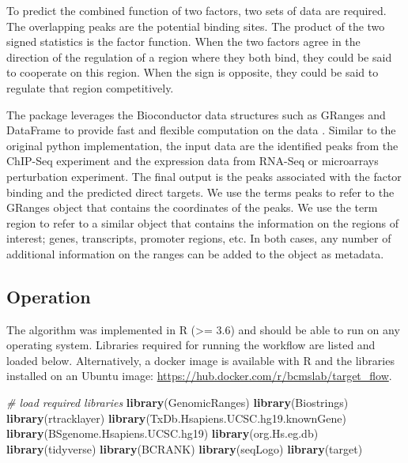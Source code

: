 \documentclass[9pt,a4paper,]{extarticle}
\newenvironment{Shaded}{\begin{snugshade}}{\end{snugshade}}
\newcommand{\CommentTok}[1]{\textcolor[rgb]{0.56,0.35,0.01}{\textit{#1}}}
\newcommand{\KeywordTok}[1]{\textcolor[rgb]{0.13,0.29,0.53}{\textbf{#1}}}
\newcommand{\NormalTok}[1]{#1}
\begin{document}
To predict the combined function of two factors, two sets of data are required. The overlapping peaks are the potential binding sites. The product of the two signed statistics is the factor function. When the two factors agree in the direction of the regulation of a region where they both bind, they could be said to cooperate on this region. When the sign is opposite, they could be said to regulate that region competitively.

The package leverages the Bioconductor data structures such as GRanges and DataFrame to provide fast and flexible computation on the data \citet{Huber2015}. Similar to the original python implementation, the input data are the identified peaks from the ChIP-Seq experiment and the expression data from RNA-Seq or microarrays perturbation experiment. The final output is the peaks associated with the factor binding and the predicted direct targets. We use the terms peaks to refer to the GRanges object that contains the coordinates of the peaks. We use the term region to refer to a similar object that contains the information on the regions of interest; genes, transcripts, promoter regions, etc. In both cases, any number of additional information on the ranges can be added to the object as metadata.

\hypertarget{operation}{%
\subsection{Operation}\label{operation}}

The algorithm was implemented in R (\textgreater= 3.6) and should be able to run on any operating system. Libraries required for running the workflow are listed and loaded below. Alternatively, a docker image is available with R and the libraries installed on an Ubuntu image: \url{https://hub.docker.com/r/bcmslab/target_flow}.

\begin{Shaded}
\begin{Highlighting}[]
\CommentTok{# load required libraries}
\KeywordTok{library}\NormalTok{(GenomicRanges)}
\KeywordTok{library}\NormalTok{(Biostrings)}
\KeywordTok{library}\NormalTok{(rtracklayer)}
\KeywordTok{library}\NormalTok{(TxDb.Hsapiens.UCSC.hg19.knownGene)}
\KeywordTok{library}\NormalTok{(BSgenome.Hsapiens.UCSC.hg19)}
\KeywordTok{library}\NormalTok{(org.Hs.eg.db)}
\KeywordTok{library}\NormalTok{(tidyverse)}
\KeywordTok{library}\NormalTok{(BCRANK)}
\KeywordTok{library}\NormalTok{(seqLogo)}
\KeywordTok{library}\NormalTok{(target)}
\end{Highlighting}
\end{Shaded}
\end{document}

